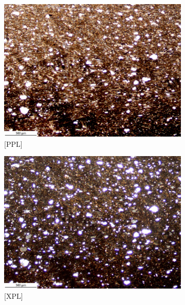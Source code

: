 \documentclass[a4paper]{article}
\begin{document}
\begin{figure}[H]
	\centering
	\begin{subfigure}[t]{.49\textwidth}
		\includegraphics[width=\textwidth]{ThinSections/2-1_4x_PPL.jpg}
		\caption{[PPL]}
	\end{subfigure}\hspace{.5em}\hfill
	\begin{subfigure}[t]{.49\textwidth}
		\includegraphics[width=\textwidth]{ThinSections/2-1_4x_XPL.jpg}
		\caption{[XPL]}
	\end{subfigure}
	\begin{subfigure}[t]{.32\textwidth}

\end{subfigure}
\end{figure}
\end{document}
